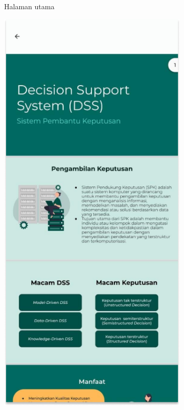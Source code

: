 \begin{figure}[H]
\begin{subfigure}[b]{0.23\textwidth}
	  \caption{Halaman utama}
	  \label{fig:HasilMain2}
	\end{subfigure}
	\begin{subfigure}[b]{0.23\textwidth}
		\centering
	  \includegraphics[width=\linewidth]{contents/chapter-3/images/HF-materi2.png}

\end{subfigure}
\end{figure}
